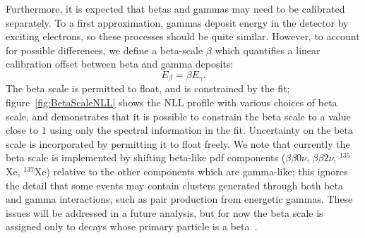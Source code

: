 Furthermore, it is expected that betas and gammas may need to be calibrated separately.  To a first approximation, gammas deposit energy in the detector by exciting electrons, so these processes should be quite similar.  However, to account for possible differences, we define a beta-scale $\beta$ which quantifies a linear calibration offset between beta and gamma deposits:
\begin{equation}
E_\beta = \beta E_\gamma.
\end{equation}
The beta scale is permitted to float, and is constrained by the fit; figure~\ref{fig:BetaScaleNLL} shows the NLL profile with various choices of beta scale, and demonstrates that it is possible to constrain the beta scale to a value close to $1$ using only the spectral information in the fit.  Uncertainty on the beta scale is incorporated by permitting it to float freely.  We note that currently the beta scale is implemented by shifting beta-like pdf components ($\beta\beta 0\nu$, $\beta\beta 2\nu$, $^{135}$Xe, $^{137}$Xe) relative to the other components which are gamma-like; this ignores the detail that some events may contain clusters generated through both beta and gamma interactions, such as pair production from energetic gammas.  These issues will be addressed in a future analysis, but for now the beta scale is assigned only to decays whose primary particle is a beta~\cite{FittingDocument}.

